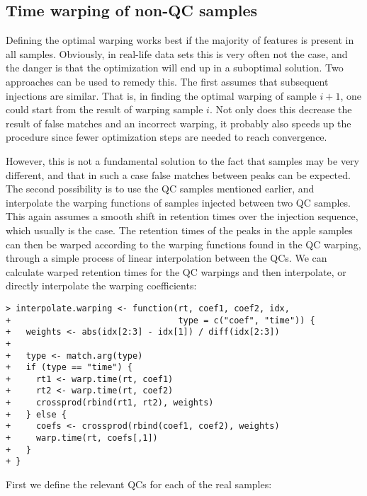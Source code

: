 \documentclass[a4paper,11pt]{article}\usepackage[]{graphicx}\usepackage[]{color}
\makeatletter
\newenvironment{kframe}{%
 \def\at@end@of@kframe{}%
 \ifinner\ifhmode%
  \def\at@end@of@kframe{\end{minipage}}%
  \begin{minipage}{\columnwidth}%
 \fi\fi%
 \def\FrameCommand##1{\hskip\@totalleftmargin \hskip-\fboxsep
 \colorbox{shadecolor}{##1}\hskip-\fboxsep
     \hskip-\linewidth \hskip-\@totalleftmargin \hskip\columnwidth}%
 \MakeFramed {\advance\hsize-\width
   \@totalleftmargin\z@ \linewidth\hsize
   \@setminipage}}%
 {\par\unskip\endMakeFramed%
 \at@end@of@kframe}
\newenvironment{knitrout}{}{} %
\makeatother
\begin{document}
\subsection{Time warping of non-QC samples}
Defining the optimal warping works best if the majority of features is
present in all samples. Obviously, in real-life data sets this is very
often not the case, and the danger is that the optimization will end
up in a suboptimal solution. Two approaches can be used to remedy
this. The first assumes that subsequent injections are similar. That
is, in finding the optimal warping of sample $i+1$, one could start
from the result of warping sample $i$. Not only does this decrease the
result of false matches and an incorrect warping, it probably also
speeds up the procedure since fewer optimization steps are needed to
reach convergence.

However, this is not a fundamental solution to the fact that samples
may be very different, and that in such a case false matches between
peaks can be expected. The second possibility is to use the QC samples
mentioned earlier, and interpolate the warping functions of samples
injected between two QC samples. This again assumes a smooth shift in
retention times over the injection sequence, which usually is the case.
The retention times of the peaks in the apple samples can then be
warped according to the warping functions found in the QC warping,
through a simple process of linear interpolation between the QCs. We
can calculate warped retention times for the QC warpings and then
interpolate, or directly interpolate the warping coefficients:

\begin{knitrout}\small
{}\color{fgcolor}\begin{kframe}
\begin{verbatim}
> interpolate.warping <- function(rt, coef1, coef2, idx, 
+                                 type = c("coef", "time")) { 
+   weights <- abs(idx[2:3] - idx[1]) / diff(idx[2:3])
+   
+   type <- match.arg(type)
+   if (type == "time") {
+     rt1 <- warp.time(rt, coef1)
+     rt2 <- warp.time(rt, coef2)
+     crossprod(rbind(rt1, rt2), weights)
+   } else {
+     coefs <- crossprod(rbind(coef1, coef2), weights)
+     warp.time(rt, coefs[,1])
+   }
+ }
\end{verbatim}
\end{kframe}
\end{knitrout}

\noindent
First we define the relevant QCs for each of the real samples:
\end{document}
